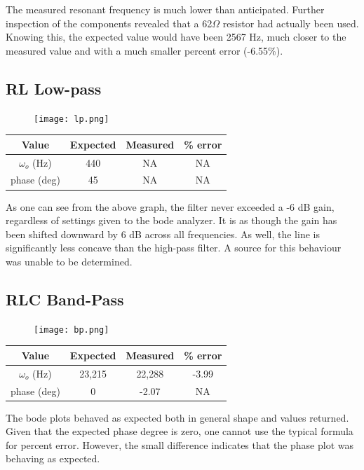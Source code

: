 \documentclass[journal]{IEEEtran}
\begin{document}
The measured resonant frequency is much lower than anticipated. Further inspection of the components revealed that a 62$\Omega$ resistor had actually been used. Knowing this, the expected value would have been 2567 Hz, much closer to the measured value and with a much smaller percent error (-6.55\%).

\subsection{RL Low-pass}

\begin{figure}[H]
\centering
\texttt{[image: lp.png]}
\label{fig_hp}
\end{figure}

\begin{tabular}{|c|c|c|c|}
\hline
Value & Expected & Measured & \% error \\
\hline
$\omega_{o}$ (Hz) & 440 & NA & NA\\
\hline
phase (deg) & 45 & NA & NA\\
\hline
\end{tabular}

As one can see from the above graph, the filter never exceeded a -6 dB gain, regardless of settings given to the bode analyzer. It is as though the gain has been shifted downward by 6 dB across all frequencies. As well, the line is significantly less concave than the high-pass filter. A source for this behaviour was unable to be determined.

\subsection{RLC Band-Pass}

\begin{figure}[H]
\centering
\texttt{[image: bp.png]}
\label{fig_hp}
\end{figure}

\begin{tabular}{|c|c|c|c|}
\hline
Value & Expected & Measured & \% error \\
\hline
$\omega_{o}$ (Hz) & 23,215 & 22,288 & -3.99\\
\hline
phase (deg) & 0 & -2.07 & NA\\
\hline
\end{tabular}

The bode plots behaved as expected both in general shape and values returned. Given that the expected phase degree is zero, one cannot use the typical formula for percent error. However, the small difference indicates that the phase plot was behaving as expected. 
\end{document}
